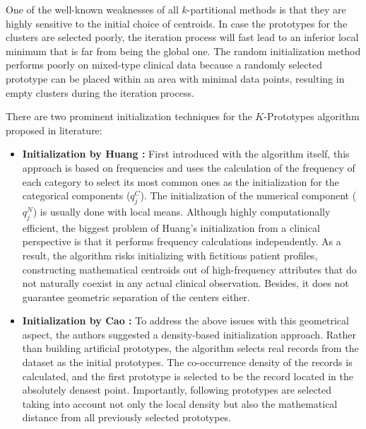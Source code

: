 One of the well-known weaknesses of all $k$-partitional methods is that they are highly sensitive to the initial choice of centroids. In case the prototypes for the clusters are selected poorly, the iteration process will fast lead to an inferior local minimum that is far from being the global one. The random initialization method performs poorly on mixed-type clinical data because a randomly selected prototype can be placed within an area with minimal data points, resulting in empty clusters during the iteration process.

\vspace{1em}

There are two prominent initialization techniques for the $K$-Prototypes algorithm proposed in literature:

\begin{itemize}
    \item \textbf{Initialization by Huang \cite{huang1998}:} First introduced with the algorithm itself, this approach is based on frequencies and uses the calculation of the frequency of each category to select its most common ones as the initialization for the categorical components ($q_j^C$). The initialization of the numerical component ($q_j^N$) is usually done with local means. Although highly computationally efficient, the biggest problem of Huang's initialization from a clinical perspective is that it performs frequency calculations independently. As a result, the algorithm risks initializing with fictitious patient profiles, constructing mathematical centroids out of high-frequency attributes that do not naturally coexist in any actual clinical observation. Besides, it does not guarantee geometric separation of the centers either.

    \item \textbf{Initialization by Cao \cite{cao2009}:} To address the above issues with this geometrical aspect, the authors suggested a density-based initialization approach. Rather than building artificial prototypes, the algorithm selects real records from the dataset as the initial prototypes. The co-occurrence density of the records is calculated, and the first prototype is selected to be the record located in the absolutely densest point. Importantly, following prototypes are selected taking into account not only the local density but also the mathematical distance from all previously selected prototypes.
\end{itemize}

\vspace{1em}

